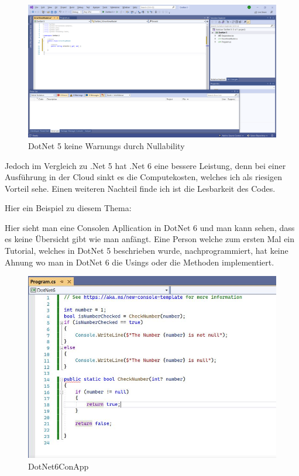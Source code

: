 \begin{figure}[H]
    \centering
    \includegraphics[width=1\textwidth]{pics/DotNet5Nullability.png}
    \caption{DotNet 5 keine Warnungs durch Nullability}
\end{figure}




Jedoch im Vergleich zu .Net 5 hat .Net 6 eine bessere Leistung, denn bei einer Ausführung in der Cloud sinkt es die Computekosten, welches ich als riesigen Vorteil sehe.
Einen weiteren Nachteil finde ich ist die Lesbarkeit des Codes.

Hier ein Beispiel zu diesem Thema:

Hier sieht man eine Consolen Apllication in DotNet 6 und man kann sehen,
dass es keine Übersicht gibt wie man anfängt. Eine Person welche zum ersten Mal ein Tutorial, welches in DotNet 5 beschrieben wurde, nachprogrammiert, hat keine Ahnung 
wo man in DotNet 6 die Usings oder die Methoden implementiert. 




\begin{figure}[H]
    \centering
    \includegraphics[width=1\textwidth]{./pics/DotNet6ConApp.JPG}
    \caption{DotNet6ConApp}
\end{figure}


